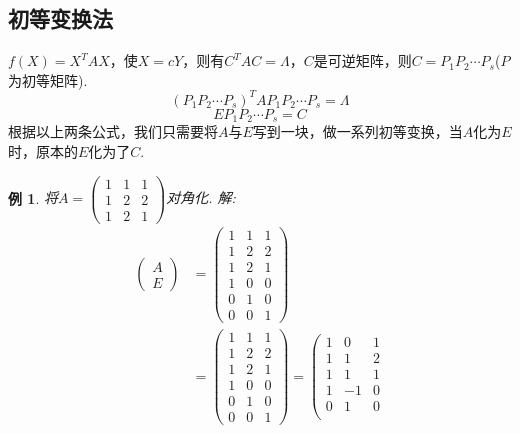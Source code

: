 \documentclass[12pt, a4paper, oneside]{ctexbook}
\newtheorem{example}[theorem]{例}
\begin{document}
\subsection{初等变换法}

$f(X) = X^TAX$，使$X=cY$，则有$C^TAC=\Lambda$，$C$是可逆矩阵，则$C=P_1P_2\cdots P_s$($P$为初等矩阵). 
$$(P_1P_2 \cdots P_s)^TAP_1P_2 \cdots P_s = \Lambda$$
$$EP_1P_2 \cdots P_s = C$$
根据以上两条公式，我们只需要将$A$与$E$写到一块，做一系列初等变换，当$A$化为$E$时，原本的$E$化为了$C$. 

\begin{example}
    将$A=\begin{pmatrix}
        1 & 1 & 1 \\
        1 & 2 & 2 \\
        1 & 2 & 1
    \end{pmatrix}$对角化. 
    \newline
    解: $$\begin{aligned}
        \begin{pmatrix}
            A \\ E
        \end{pmatrix} &= \left ( \begin{array}{ccc}
            1 & 1 & 1 \\
            1 & 2 & 2 \\
            1 & 2 & 1 \\ \hline
            1 & 0 & 0 \\
            0 & 1 & 0 \\
            0 & 0 & 1
        \end{array} \right ) \\
        &= \left ( \begin{array}{ccc}
            1 & 1 & 1 \\
            1 & 2 & 2 \\
            1 & 2 & 1 \\ \hline
            1 & 0 & 0 \\
            0 & 1 & 0 \\
            0 & 0 & 1
        \end{array} \right ) = \left ( \begin{array}{ccc}
            1 & 0 & 1 \\
            1 & 1 & 2 \\
            1 & 1 & 1 \\ \hline
            1 & -1 & 0 \\
            0 & 1 & 0 \\

\end{array}
\end{aligned}$$
\end{example}
\end{document}
